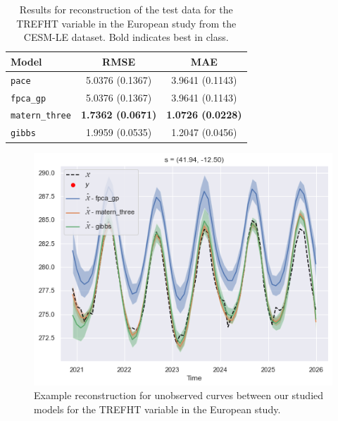 \begin{table}
	\caption[Results for TREFHT variable on test data in the European study]{Results for reconstruction of the test data for the TREFHT variable in the European study from the CESM-LE dataset. Bold indicates best in class.}
	\centering
	\label{tab:test_cesm_trefht_eur}
	\begin{tabular}{lcc}
		\toprule
		\textbf{Model} & \textbf{RMSE} & \textbf{MAE} \\
		\midrule
		\verb*|pace| &5.0376 (0.1367) & 3.9641	(0.1143) \\
		\verb*|fpca_gp| & 	5.0376	(0.1367) & 3.9641 (0.1143) \\
		\verb*|matern_three| & \textbf{	1.7362 (0.0671)} & \textbf{1.0726 (0.0228)}\\
		\verb*|gibbs| & 1.9959 (0.0535) & 1.2047 (0.0456)\\
		\bottomrule
	\end{tabular}
\end{table}

\begin{figure}
	\centering
	\includegraphics[width=\textwidth]{test_ex_trefht_eur}
	\caption{Example reconstruction for unobserved curves between our studied models for the TREFHT variable in the European study.}
	\label{fig:test_ex_trefht_eur}
\end{figure}

